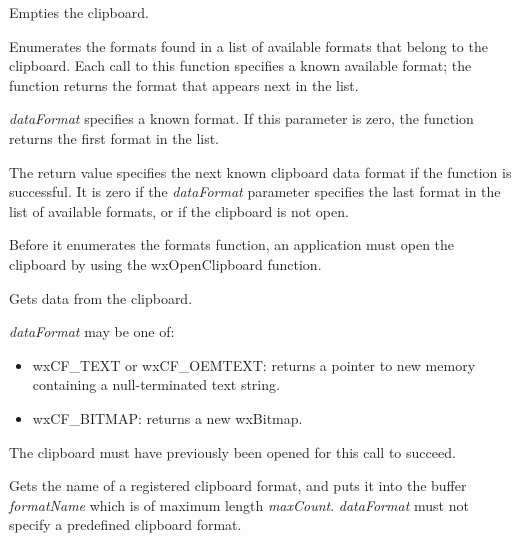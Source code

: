 
Empties the clipboard.



Enumerates the formats found in a list of available formats that belong
to the clipboard. Each call to this  function specifies a known
available format; the function returns the format that appears next in
the list. 

{\it dataFormat} specifies a known format. If this parameter is zero,
the function returns the first format in the list. 

The return value specifies the next known clipboard data format if the
function is successful. It is zero if the {\it dataFormat} parameter specifies
the last  format in the list of available formats, or if the clipboard
is not open. 

Before it enumerates the formats function, an application must open the clipboard by using the 
wxOpenClipboard function. 



Gets data from the clipboard.

{\it dataFormat} may be one of:

\begin{itemize}\itemsep=0pt
\item wxCF\_TEXT or wxCF\_OEMTEXT: returns a pointer to new memory containing a null-terminated text string.
\item wxCF\_BITMAP: returns a new wxBitmap.
\end{itemize}

The clipboard must have previously been opened for this call to succeed.



Gets the name of a registered clipboard format, and puts it into the buffer {\it formatName} which is of maximum
length {\it maxCount}. {\it dataFormat} must not specify a predefined clipboard format.



